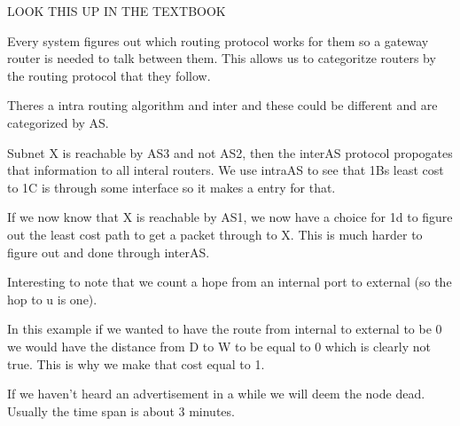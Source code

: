 \documentclass[12pt]{article}
\begin{document}

LOOK THIS UP IN THE TEXTBOOK



Every system figures out which routing protocol works for them so a gateway router is needed to talk between them. This allows us to categoritze routers by the routing protocol that they follow.


Theres a intra routing algorithm and inter and these could be different and are categorized by AS. 


Subnet X is reachable by AS3 and not AS2, then the interAS protocol propogates that information to all interal routers. We use intraAS to see that  1Bs least cost to 1C is through some interface so it makes a entry for that.


If we now know that X is reachable by AS1, we now have a choice for 1d to figure out the least cost path to get a packet through to X. This is much harder to figure out and done through interAS. 






Interesting to note that we count a hope from an internal port to external (so the hop to u is one).


In this example if we wanted to have the route from internal to external to be 0 we would have the distance from D to W to be equal to 0 which is clearly not true. This is why we make that cost equal to 1.


If we haven't heard an advertisement in a while we will deem the node dead. Usually the time span is about 3 minutes. 


\end{document}
